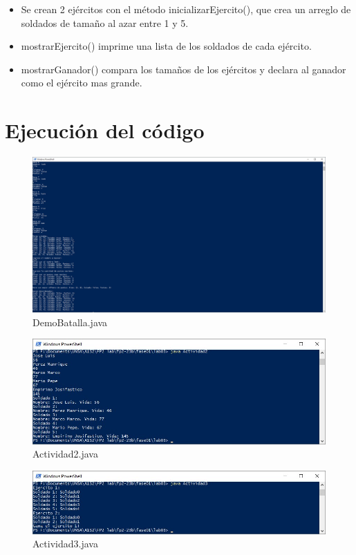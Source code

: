 \documentclass{article}
\begin{document}
\pagebreak

\begin{itemize}
	\item Se crean 2 ejércitos con el método inicializarEjercito(), que crea un arreglo de soldados de tamaño al azar entre 1 y 5.
	\item mostrarEjercito() imprime una lista de los soldados de cada ejército.
	\item mostrarGanador() compara los tamaños de los ejércitos y declara al ganador como el ejército mas grande.
\end{itemize}
\pagebreak

\section{Ejecución del código}
\begin{figure}[H]
	\centering
	\includegraphics[width=1\textwidth,keepaspectratio]{img/ejec01.jpg}
	\caption{DemoBatalla.java}
\end{figure}
\begin{figure}[H]
	\centering
	\includegraphics[width=1\textwidth,keepaspectratio]{img/ejec02.jpg}
	\caption{Actividad2.java}
\end{figure}
\begin{figure}[H]
	\centering
	\includegraphics[width=1\textwidth,keepaspectratio]{img/ejec03.jpg}
	\caption{Actividad3.java}
\end{figure}
\pagebreak
\end{document}
